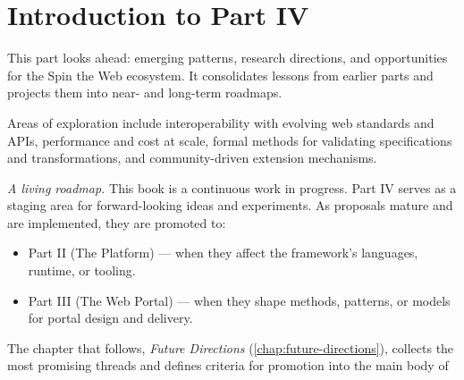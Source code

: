 
\chapter*{Introduction to Part IV}
\label{part:future}

This part looks ahead: emerging patterns, research directions, and opportunities for the Spin the Web ecosystem. It consolidates lessons from earlier parts and projects them into near- and long-term roadmaps.

Areas of exploration include interoperability with evolving web standards and APIs, performance and cost at scale, formal methods for validating specifications and transformations, and community-driven extension mechanisms.

\textit{A living roadmap.} This book is a continuous work in progress. Part IV serves as a staging area for forward-looking ideas and experiments. As proposals mature and are implemented, they are promoted to:
\begin{itemize}++
  \item Part II (The Platform) --- when they affect the framework’s languages, runtime, or tooling.
  \item Part III (The Web Portal) --- when they shape methods, patterns, or models for portal design and delivery.
\end{itemize}

\noindent The chapter that follows, \emph{Future Directions} (\cref{chap:future-directions}), collects the most promising threads and defines criteria for promotion into the main body of

